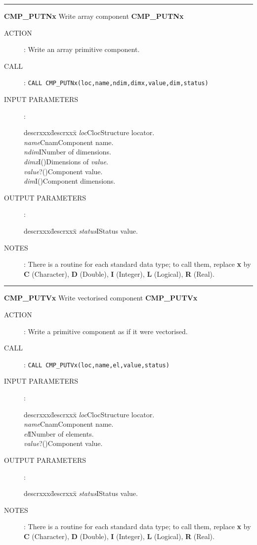 \goodbreak
\rule{\textwidth}{0.3mm}
{\Large {\bf CMP\_PUTNx} \hfill Write array component \hfill {\bf CMP\_PUTNx}}
\begin{description}
\item [ACTION]:
Write an array primitive component.
\item [CALL]:
{\tt CALL CMP\_PUTNx(loc,name,ndim,dimx,value,dim,status)}
\item [INPUT PARAMETERS]:
\begin{tabbing}
descrxxx\=descrxxx\=\kill
{\em loc}\>Cloc\>Structure locator.\\
{\em name}\>Cnam\>Component name.\\
{\em ndim}\>I\>Number of dimensions.\\
{\em dimx}\>I()\>Dimensions of {\em value}.\\
{\em value}\>?()\>Component value.\\
{\em dim}\>I()\>Component dimensions.
\end{tabbing}
\item [OUTPUT PARAMETERS]:
\begin{tabbing}
descrxxx\=descrxxx\=\kill
{\em status}\>I\>Status value.
\end{tabbing}
\item [NOTES]:
There is a routine for each standard data type; to call them, replace {\bf x}
by {\bf C} (Character), {\bf D} (Double), {\bf I} (Integer), {\bf L} (Logical),
{\bf R} (Real).
\end{description}
\goodbreak
\rule{\textwidth}{0.3mm}
{\Large {\bf CMP\_PUTVx} \hfill Write vectorised component \hfill {\bf CMP\_PUTVx}}
\begin{description}
\item [ACTION]:
Write a primitive component as if it were vectorised.
\item [CALL]:
{\tt CALL CMP\_PUTVx(loc,name,el,value,status)}
\item [INPUT PARAMETERS]:
\begin{tabbing}
descrxxx\=descrxxx\=\kill
{\em loc}\>Cloc\>Structure locator.\\
{\em name}\>Cnam\>Component name.\\
{\em el}\>I\>Number of elements.\\
{\em value}\>?()\>Component value.
\end{tabbing}
\item [OUTPUT PARAMETERS]:
\begin{tabbing}
descrxxx\=descrxxx\=\kill
{\em status}\>I\>Status value.
\end{tabbing}
\item [NOTES]:
There is a routine for each standard data type; to call them, replace {\bf x}
by {\bf C} (Character), {\bf D} (Double), {\bf I} (Integer), {\bf L} (Logical),
{\bf R} (Real).
\end{description}
